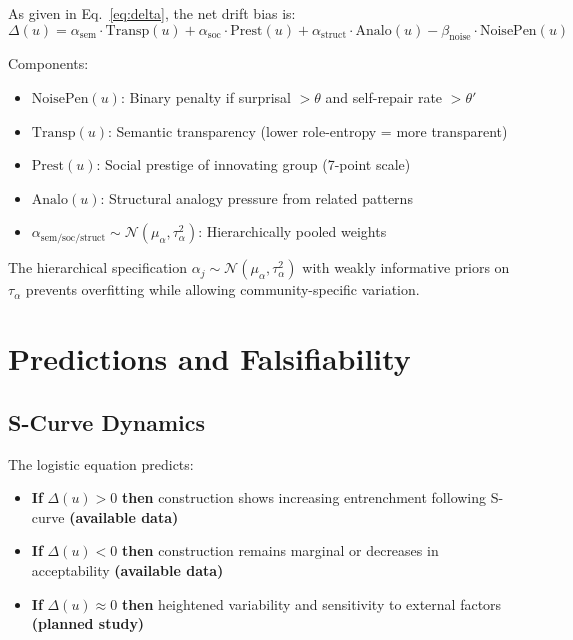 \documentclass[12pt]{article}
\begin{document}
As given in Eq.~\eqref{eq:delta}, the net drift bias is:
\begin{equation}\label{eq:delta}
\Delta(u)=
   \alpha_{\mathrm{sem}}\!\cdot\!\text{Transp}(u)+
   \alpha_{\mathrm{soc}}\!\cdot\!\text{Prest}(u)+
   \alpha_{\mathrm{struct}}\!\cdot\!\text{Analo}(u)-
   \beta_{\mathrm{noise}}\cdot\text{NoisePen}(u)
\end{equation}

Components:
\begin{itemize}
    \item $\text{NoisePen}(u)$: Binary penalty if surprisal $> \theta$ and self-repair rate $> \theta'$
    \item $\text{Transp}(u)$: Semantic transparency (lower role-entropy = more transparent)
    \item $\text{Prest}(u)$: Social prestige of innovating group (7-point scale)
    \item $\text{Analo}(u)$: Structural analogy pressure from related patterns
    \item $\alpha_{\mathrm{sem/soc/struct}} \sim \mathcal{N}(\mu_\alpha, \tau_\alpha^2)$: Hierarchically pooled weights
\end{itemize}

The hierarchical specification $\alpha_j \sim \mathcal{N}(\mu_\alpha, \tau_\alpha^2)$ with weakly informative priors on $\tau_\alpha$ prevents overfitting while allowing community-specific variation.


\section{Predictions and Falsifiability}

\subsection{S-Curve Dynamics}

The logistic equation predicts:
\begin{itemize}
\item \textbf{If} $\Delta(u) > 0$ \textbf{then} construction shows increasing entrenchment following S-curve \textbf{(available data)}
\item \textbf{If} $\Delta(u) < 0$ \textbf{then} construction remains marginal or decreases in acceptability \textbf{(available data)}
\item \textbf{If} $\Delta(u) \approx 0$ \textbf{then} heightened variability and sensitivity to external factors \textbf{(planned study)}
\end{itemize}
\end{document}

